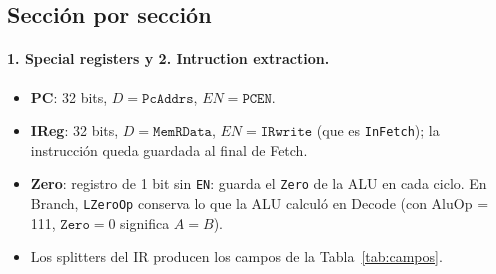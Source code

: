\documentclass[11pt,a4paper]{article}
\newcommand{\sig}[1]{\texttt{#1}}
\begin{document}
\subsection{Secci\'on por secci\'on}
\paragraph{1. Special registers y 2. Intruction extraction.}
\begin{itemize}
  \item \textbf{PC}: 32 bits, $D=\sig{PcAddrs}$, $EN=\sig{PCEN}$.
  \item \textbf{IReg}: 32 bits, $D=\sig{MemRData}$, $EN=\sig{IRwrite}$ (que es \sig{InFetch}); la instrucci\'on queda guardada al final de Fetch.
  \item \textbf{Zero}: registro de 1 bit sin \texttt{EN}: guarda el \sig{Zero} de la ALU en cada ciclo. En Branch, \sig{LZeroOp} conserva lo que la ALU calcul\'o en Decode (con AluOp = 111, $\sig{Zero}=0$ significa $A=B$).
  \item Los splitters del IR producen los campos de la Tabla~\ref{tab:campos}.
\end{itemize}
\end{document}
